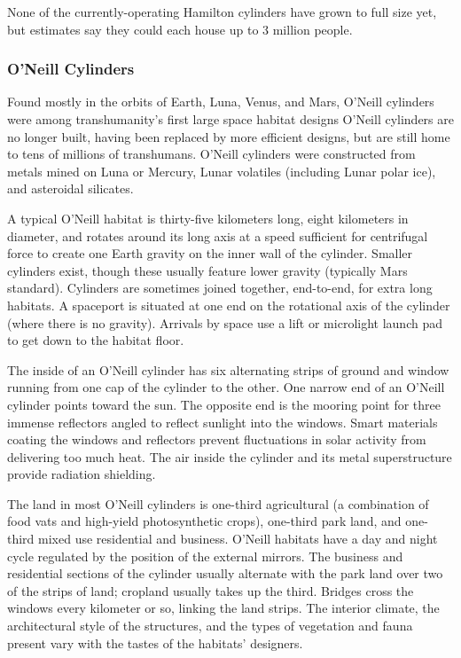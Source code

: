 None of the currently-operating Hamilton cylinders have grown 
to full size yet, but estimates say they could each house up to 3 
million people.

\subsubsection{O'Neill Cylinders}

Found mostly in the orbits of Earth, Luna, Venus, and Mars, O'Neill 
cylinders were among transhumanity's first large space habitat designs
O'Neill cylinders are no longer built, having been replaced
by more efficient designs, but are still home to tens of millions of 
transhumans. O'Neill cylinders were constructed from metals mined 
on Luna or Mercury, Lunar volatiles (including Lunar polar ice), 
and asteroidal silicates.

A typical O'Neill habitat is thirty-five kilometers long, eight kilometers
in diameter, and rotates around its long axis at a speed
sufficient for centrifugal force to create one Earth gravity on the 
inner wall of the cylinder. Smaller cylinders exist, though these 
usually feature lower gravity (typically Mars standard). Cylinders 
are sometimes joined together, end-to-end, for extra long habitats. 
A spaceport is situated at one end on the rotational axis of the 
cylinder (where there is no gravity). Arrivals by space use a lift or 
microlight launch pad to get down to the habitat floor.

The inside of an O'Neill cylinder has six alternating 
strips of ground and window running from one cap 
of the cylinder to the other. One narrow end of an 
O'Neill cylinder points toward the sun. The opposite 
end is the mooring point for three immense reflectors 
angled to reflect sunlight into the windows. Smart 
materials coating the windows and reflectors prevent 
fluctuations in solar activity from delivering too much 
heat. The air inside the cylinder and its metal superstructure
provide radiation shielding.

The land in most O'Neill cylinders is one-third 
agricultural (a combination of food vats and high-yield
photosynthetic crops), one-third park land, and
one-third mixed use residential and business. O'Neill 
habitats have a day and night cycle regulated by the 
position of the external mirrors. The business and 
residential sections of the cylinder usually alternate 
with the park land over two of the strips of land; 
cropland usually takes up the third. Bridges cross 
the windows every kilometer or so, linking the land 
strips. The interior climate, the architectural style of 
the structures, and the types of vegetation and fauna 
present vary with the tastes of the habitats' designers.


